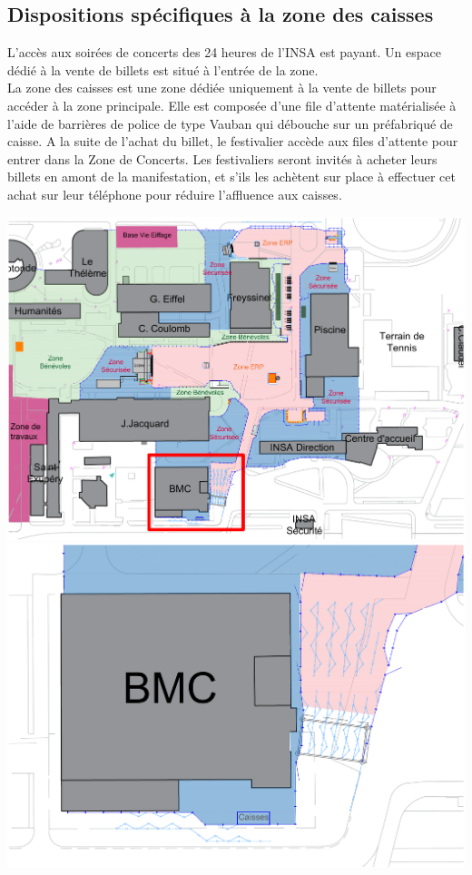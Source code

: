 \documentclass[hidelinks, paper=a4, fontsize=13pt]{report}
\begin{document}
\subsection{Dispositions spécifiques à la zone des caisses}
L’accès aux soirées de concerts des 24 heures de l’INSA est payant. Un espace dédié à la vente de billets est situé à l’entrée de la zone. \\
La zone des caisses est une zone dédiée uniquement à la vente de billets pour accéder à la zone principale. Elle est composée d'une file d’attente matérialisée à l’aide de barrières de police de type Vauban qui débouche sur un préfabriqué de caisse. A la suite de l'achat du billet, le festivalier accède aux files d'attente pour entrer dans la Zone de Concerts. Les festivaliers seront invités à acheter leurs billets en amont de la manifestation, et s'ils les achètent sur place à effectuer cet achat sur leur téléphone pour réduire l'affluence aux caisses.
\begin{center}
	\includegraphics[width=.8\textwidth,keepaspectratio]{Exports/Plan_24h_45eme-Entree}
	\includegraphics[width=.8\textwidth,keepaspectratio]{Exports/Plan_24h_45eme-Entree_zoom}
\end{center}
\end{document}
